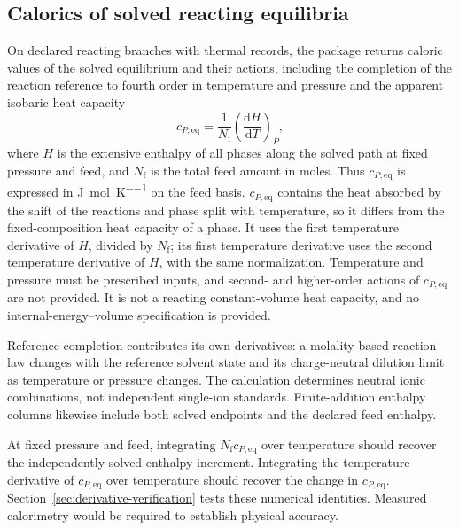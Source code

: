 \subsection{Calorics of solved reacting equilibria}
On declared reacting branches with thermal records, the package returns caloric values of the solved equilibrium and their actions, including the completion of the reaction reference to fourth order in temperature and pressure and the apparent isobaric heat capacity
\begin{equation}
c_{P,\mathrm{eq}}=\frac{1}{N_{\mathrm{f}}}\left(\frac{\mathrm{d}H}{\mathrm{d}T}\right)_{P},
\label{eq:cpeq}
\end{equation}
where $H$ is the extensive enthalpy of all phases along the solved path at fixed pressure and feed, and $N_{\mathrm{f}}$ is the total feed amount in moles.
Thus $c_{P,\mathrm{eq}}$ is expressed in \si{\joule\per\mol\per\kelvin} on the feed basis.
$c_{P,\mathrm{eq}}$ contains the heat absorbed by the shift of the reactions and phase split with temperature, so it differs from the fixed-composition heat capacity of a phase.
It uses the first temperature derivative of $H$, divided by $N_{\mathrm{f}}$; its first temperature derivative uses the second temperature derivative of $H$, with the same normalization.
Temperature and pressure must be prescribed inputs, and second- and higher-order actions of $c_{P,\mathrm{eq}}$ are not provided.
It is not a reacting constant-volume heat capacity, and no internal-energy--volume specification is provided.

Reference completion contributes its own derivatives: a molality-based reaction law changes with the reference solvent state and its charge-neutral dilution limit as temperature or pressure changes.
The calculation determines neutral ionic combinations, not independent single-ion standards.
Finite-addition enthalpy columns likewise include both solved endpoints and the declared feed enthalpy.


At fixed pressure and feed, integrating $N_{\mathrm f}c_{P,\mathrm{eq}}$ over temperature should recover the independently solved enthalpy increment.
Integrating the temperature derivative of $c_{P,\mathrm{eq}}$ over temperature should recover the change in $c_{P,\mathrm{eq}}$.
Section~\ref{sec:derivative-verification} tests these numerical identities.
Measured calorimetry would be required to establish physical accuracy.
